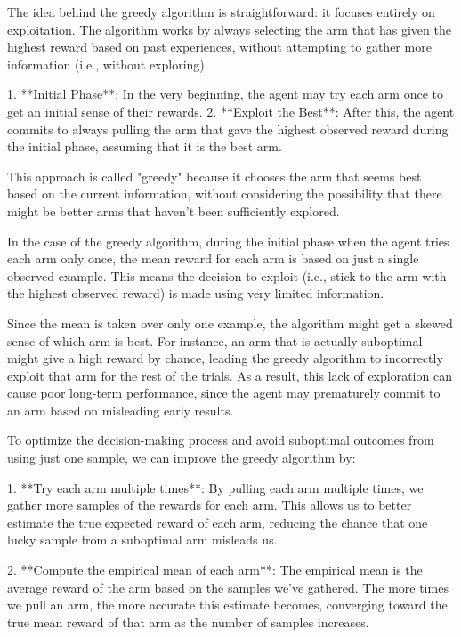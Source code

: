 The idea behind the greedy algorithm is straightforward: it focuses entirely on exploitation. The algorithm works by always selecting the arm that has given the highest reward based on past experiences, without attempting to gather more information (i.e., without exploring).

1. **Initial Phase**: In the very beginning, the agent may try each arm once to get an initial sense of their rewards.
2. **Exploit the Best**: After this, the agent commits to always pulling the arm that gave the highest observed reward during the initial phase, assuming that it is the best arm.

This approach is called "greedy" because it chooses the arm that seems best based on the current information, without considering the possibility that there might be better arms that haven’t been sufficiently explored.

\begin{warningbox}[Warning]
    In the case of the greedy algorithm, during the initial phase when the agent tries each arm only once, the mean reward for each arm is based on just a single observed example. This means the decision to exploit (i.e., stick to the arm with the highest observed reward) is made using very limited information.

    Since the mean is taken over only one example, the algorithm might get a skewed sense of which arm is best. For instance, an arm that is actually suboptimal might give a high reward by chance, leading the greedy algorithm to incorrectly exploit that arm for the rest of the trials. As a result, this lack of exploration can cause poor long-term performance, since the agent may prematurely commit to an arm based on misleading early results.
\end{warningbox}

To optimize the decision-making process and avoid suboptimal outcomes from using just one sample, we can improve the greedy algorithm by:

1. **Try each arm multiple times**: By pulling each arm multiple times, we gather more samples of the rewards for each arm. This allows us to better estimate the true expected reward of each arm, reducing the chance that one lucky sample from a suboptimal arm misleads us.

2. **Compute the empirical mean of each arm**: The empirical mean is the average reward of the arm based on the samples we've gathered. The more times we pull an arm, the more accurate this estimate becomes, converging toward the true mean reward of that arm as the number of samples increases.

